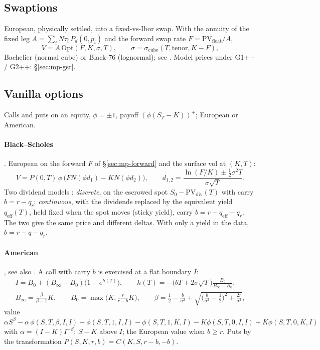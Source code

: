 \subsection{Swaptions}\label{sec:mp-swaption}
European, physically settled, into a fixed-vs-Ibor swap. With the annuity of the fixed leg $A = \sum_i N\tau_i\,P_d(0,p_i)$ and
the forward swap rate $F = \mathrm{PV}_{\mathrm{float}}/A$,
\[
  V = A\,\mathrm{Opt}(F, K, \sigma, T),\qquad \sigma = \sigma_{\mathrm{cube}}(T, \text{tenor}, K - F),
\]
Bachelier (normal cube) or Black-76 (lognormal); see \citet{brigo2006}. Model prices under G1++ / G2++: \S\ref{sec:mp-gsr}.

\subsection{Vanilla options}\label{sec:mp-vanilla}
Calls and puts on an equity, $\phi = \pm 1$, payoff $(\phi(S_T - K))^+$; European or American.

\paragraph{Black--Scholes} \citep{black1973,merton1973}. European on the forward $F$ of \S\ref{sec:mp-forward} and the
surface vol at $(K, T)$:
\[
  V = P(0,T)\,\phi\,\big(F N(\phi d_1) - K N(\phi d_2)\big),\qquad d_{1,2} = \frac{\ln(F/K) \pm \tfrac12 \sigma^2 T}{\sigma\sqrt T}.
\]
Two dividend models \citep{haug2003}: \emph{discrete}, on the escrowed spot $S_0 - \mathrm{PV}_{\mathrm{div}}(T)$ with carry $b = r - q_r$;
\emph{continuous}, with the dividends replaced by the equivalent yield $q_{\mathrm{eff}}(T)$, held fixed when the spot moves
(sticky yield), carry $b = r - q_{\mathrm{eff}} - q_r$. The two give the same price and different deltas. With only a yield in
the data, $b = r - q - q_r$.

\paragraph{American} \citep{bjerksund1993}, see also \citet{haug2007}. A call with carry $b$ is exercised at a flat
boundary $I$:
\begin{gather*}
  I = B_0 + (B_\infty - B_0)\big(1 - e^{h(T)}\big),\qquad h(T) = -\big(bT + 2\sigma\sqrt T\big)\frac{B_0}{B_\infty - B_0},\\
  B_\infty = \frac{\beta}{\beta - 1}K,\qquad B_0 = \max\Big(K, \frac{r}{r-b}K\Big),\qquad
  \beta = \tfrac12 - \frac{b}{\sigma^2} + \sqrt{\Big(\frac{b}{\sigma^2} - \tfrac12\Big)^2 + \frac{2r}{\sigma^2}},
\end{gather*}
value $\alpha S^\beta - \alpha\,\phi(S,T,\beta,I,I) + \phi(S,T,1,I,I) - \phi(S,T,1,K,I) - K\phi(S,T,0,I,I) + K\phi(S,T,0,K,I)$ with
$\alpha = (I - K)I^{-\beta}$; $S - K$ above $I$; the European value when $b \ge r$. Puts by the transformation
$P(S, K, r, b) = C(K, S, r - b, -b)$.

